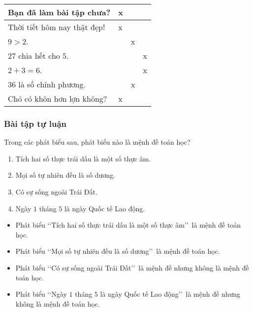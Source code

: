 \begin{vd}
{\begin{center}
\begin{tabular}{|>{\raggedright\arraybackslash}m{5.5cm}|>{\centering\arraybackslash}m{2cm}|>{\centering\arraybackslash}m{2cm}|>{\centering\arraybackslash}m{2cm}|}
				\hline
				Bạn đã làm bài tập chưa? & x &  &  \\
				\hline
				Thời tiết hôm nay thật đẹp! & x &  &  \\
				\hline
				$9>2$. &  & x &  \\
				\hline
				$27$ chia hết cho $5$. &  &  & x \\
				\hline
				$2+3=6$. &  &  & x \\
				\hline
				$36$ là số chính phương. &  & x &  \\
				\hline
				Chó có khôn hơn lợn không? & x &  &  \\
				\hline
			\end{tabular}
		\end{center}
	}
\end{vd}

\subsubsection{Bài tập tự luận}
\begin{bt}%
	Trong các phát biểu sau, phát biểu nào là mệnh đề toán học?
	\begin{enumerate}
		\item Tích hai số thực trái dấu là một số thực âm.
		\item Mọi số tự nhiên đều là số dương.
		\item Có sự sống ngoài Trái Đất.
		\item Ngày $1$ tháng $5$ là ngày Quốc tế Lao động.
	\end{enumerate}
	\loigiai
	{
		\begin{itemize}
			\item Phát biểu \lq\lq Tích hai số thực trái dấu là một số thực âm\rq\rq\ là mệnh đề toán học.
			\item Phát biểu \lq\lq Mọi số tự nhiên đều là số dương\rq\rq\ là mệnh đề toán học.
			\item Phát biểu \lq\lq Có sự sống ngoài Trái Đất\rq\rq\ là mệnh đề nhưng không là mệnh đề toán học.
			\item Phát biểu \lq\lq Ngày $1$ tháng $5$ là ngày Quốc tế Lao động\rq\rq\ là mệnh đề nhưng không là mệnh đề toán học.
		\end{itemize}
	}
\end{bt}
